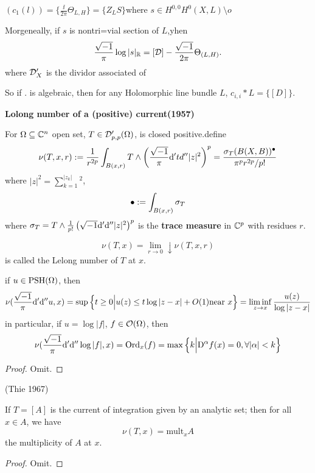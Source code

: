 \begin{cor}
$(c_1(l))=\{\frac{\ii}{2\pi}\Theta_{L,H}\}=
\{Z_LS\}$where $s\in H^{0,0}H^0(X,L)\setminus{o}$

Morgeneally, if $s$ is nontri=vial section of $L$,yhen
$$
  \frac{\sqrt{-1}}{\pi}\log|s|_{\mathbb{R}}=[\mathcal{D}]-\frac{\sqrt{-1}}{2\pi}\Theta_{(L,H)}.
 $$ where $\mathcal{D}'_X$ is the dividor associated of %

So if $.$ is algebraic, then for any Holomorphic line bundle $L$,
$c_{i,i}*L=\{[D]\}.$
\end{cor}


\textbf{Lolong number of a (positive) current(1957)}

For $\Omega\subseteq\mathbb{C}^n$ open set, $T\in\mathcal{D}'_{p,p}(\Omega)$,
is closed positive.define
$$\nu(T,x,r):=
\frac{1}{r^{2p}}
\int_{B(x,r)}T\wedge
\left(\frac{\sqrt{-1}}{\pi}\mathrm{d}'td''|z|^2\right)^p
=
  \frac{\sigma_T(B(X,B))^{\bullet}}
       {\pi^pr^{2p}/p!}
$$
where $|z|^2=\sum_{k=1}^|z_k|^2$,
$$\bullet:=
\int_{B(x,r)}
\sigma_T
$$
where $\sigma_T=T\wedge\frac{1}{p!}\left(
\sqrt{-1}\mathrm{d}'\mathrm{d}''|z|^2\right)^p$
is the \textbf{trace measure} in $\mathbb{C}^p$ with residues $r$.

\begin{thm}
$$\nu(T,x)=\lim_{r\to 0}\downarrow \nu(T,x,r)$$
is called the Lelong number of $T$ at $x$.
\end{thm}

\begin{thm}
if $u\in\operatorname{PSH}(\Omega)$, then
$$
  \nu(\frac{\sqrt{-1}}{\pi}\mathrm{d}'\mathrm{d}'' u,x)
=
  \sup\Big\{ t\geq 0 \Big| u(z)\leq t\log|z-x|+O(1)\text{near $x$} \Big\}
=
  \liminf_{z\to x}\frac{u(z)}{\log|z-x|}
$$
in particular, if $u=\log |f|$, $f\in\mathcal{O}(\Omega)$, then
$$
  \nu(\frac{\sqrt{-1}}{\pi}\mathrm{d}'\mathrm{d}''\log|f|,x)
=
  \operatorname{Ord}_x(f)
=
  \max\Big\{ k \Big| \mathrm{D}^\alpha f(x)=0,\forall |\alpha|<k \Big\}
$$
\end{thm}

\begin{proof}
  Omit.
\end{proof}

\begin{thm}(Thie 1967)

If $T=[A]$ is the current of integration given by an
analytic set; then for all $x\in A$, we have
$$\nu(T,x)=\text{mult}_xA$$
the multiplicity of $A$ at $x$.
\end{thm}

\begin{proof}
  Omit.
\end{proof}

